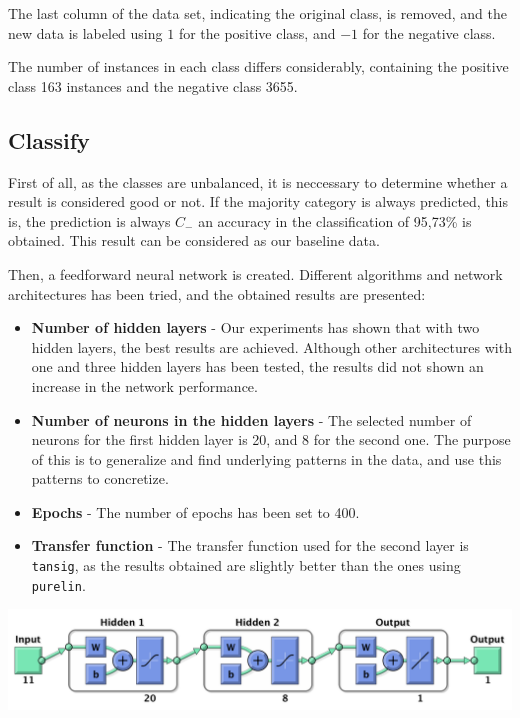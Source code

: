 \documentclass[10pt]{article}
\begin{document}
\begin{multicols}{2}
    The last column of the data set, indicating the original class, is removed, and
    the new data is labeled using $1$ for the positive class, and $-1$ for the negative
    class.

    The number of instances in each class differs considerably, containing the positive
    class 163 instances and the negative class 3655. 

    \subsection*{Classify}
    First of all, as the classes are unbalanced, it is neccessary to determine whether
    a result is considered good or not. If the majority category is always predicted,
    this is, the prediction is always $C_{-}$ an accuracy in the classification of
    95,73\% is obtained. This result can be considered as our baseline data.
    
    Then, a feedforward neural network is created. Different algorithms and network
    architectures has been tried, and the obtained results are presented:

    \begin{itemize}
    \item \textbf{Number of hidden layers} - Our experiments has shown that with two hidden
      layers, the best results are achieved. Although other architectures with
      one and three hidden layers has been tested, the results did not shown an increase in
      the network performance.
    \item \textbf{Number of neurons in the hidden layers} - The selected number of neurons for the
      first hidden layer is 20, and 8 for the second one. The purpose of this is to
      generalize and find underlying patterns in the data, and use this patterns
      to concretize.
    \item \textbf{Epochs} - The number of epochs has been set to 400.
    \item \textbf{Transfer function} - The transfer function used for the second
      layer is \texttt{tansig}, as the results obtained are slightly better than
      the ones using \texttt{purelin}.
    \end{itemize}

    \begin{center}
    \includegraphics[width=\linewidth]{img/net}
    \end{center}


\end{multicols}
\end{document}
